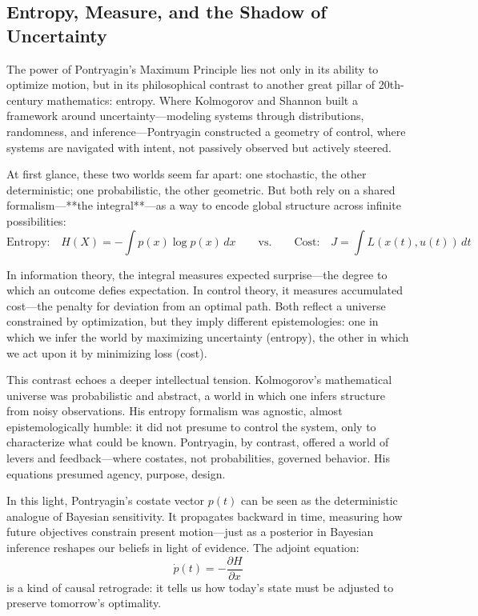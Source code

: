 \subsection{Entropy, Measure, and the Shadow of Uncertainty}

The power of Pontryagin’s Maximum Principle lies not only in its ability to optimize motion, but in its philosophical contrast to another great pillar of 20th-century mathematics: entropy. Where Kolmogorov and Shannon built a framework around uncertainty—modeling systems through distributions, randomness, and inference—Pontryagin constructed a geometry of control, where systems are navigated with intent, not passively observed but actively steered.

At first glance, these two worlds seem far apart: one stochastic, the other deterministic; one probabilistic, the other geometric. But both rely on a shared formalism—**the integral**—as a way to encode global structure across infinite possibilities:
\[
\text{Entropy:}\quad H(X) = - \int p(x) \log p(x) \, dx
\qquad \text{vs.} \qquad
\text{Cost:}\quad J = \int L(x(t), u(t)) \, dt
\]

In information theory, the integral measures expected surprise—the degree to which an outcome defies expectation. In control theory, it measures accumulated cost—the penalty for deviation from an optimal path. Both reflect a universe constrained by optimization, but they imply different epistemologies: one in which we infer the world by maximizing uncertainty (entropy), the other in which we act upon it by minimizing loss (cost).

This contrast echoes a deeper intellectual tension. Kolmogorov’s mathematical universe was probabilistic and abstract, a world in which one infers structure from noisy observations. His entropy formalism was agnostic, almost epistemologically humble: it did not presume to control the system, only to characterize what could be known. Pontryagin, by contrast, offered a world of levers and feedback—where costates, not probabilities, governed behavior. His equations presumed agency, purpose, design.

In this light, Pontryagin’s costate vector \( p(t) \) can be seen as the deterministic analogue of Bayesian sensitivity. It propagates backward in time, measuring how future objectives constrain present motion—just as a posterior in Bayesian inference reshapes our beliefs in light of evidence. The adjoint equation:
\[
\dot{p}(t) = -\frac{\partial H}{\partial x}
\]
is a kind of causal retrograde: it tells us how today's state must be adjusted to preserve tomorrow's optimality.

